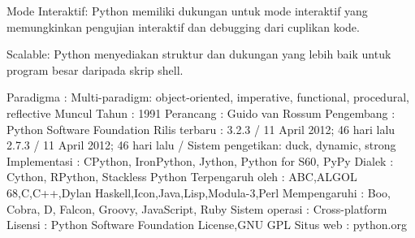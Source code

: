 \noindent 
{\fontsize{14pt}{14pt}\selectfont Mode Interaktif: Python memiliki dukungan untuk mode interaktif yang memungkinkan pengujian interaktif dan debugging dari cuplikan kode. \\} \par
\vspace{14pt}
\vspace{14pt}
\noindent 
{\fontsize{14pt}{14pt}\selectfont Scalable: Python menyediakan struktur dan dukungan yang lebih baik untuk program besar daripada skrip shell. \\} \par
\vspace{14pt}
\noindent 
{\fontsize{14pt}{14pt}\selectfont Paradigma : Multi-paradigm: object-oriented, imperative, functional, procedural, reflective\vspace{\baselineskip}
Muncul Tahun : 1991\vspace{\baselineskip}
Perancang : Guido van Rossum\vspace{\baselineskip}
Pengembang : Python Software Foundation\vspace{\baselineskip}
Rilis terbaru : 3.2.3 / 11 April 2012; 46 hari lalu 2.7.3 / 11 April 2012; 46 hari lalu /\vspace{\baselineskip}
Sistem pengetikan: duck, dynamic, strong\vspace{\baselineskip}
Implementasi : CPython, IronPython, Jython, Python for S60, PyPy\vspace{\baselineskip}
Dialek : Cython, RPython, Stackless Python\vspace{\baselineskip}
Terpengaruh oleh : ABC,ALGOL 68,C,C++,Dylan Haskell,Icon,Java,Lisp,Modula-3,Perl\vspace{\baselineskip}
Mempengaruhi : Boo, Cobra, D, Falcon, Groovy, JavaScript, Ruby\vspace{\baselineskip}
Sistem operasi : Cross-platform\vspace{\baselineskip}
Lisensi : Python Software Foundation License,GNU GPL\vspace{\baselineskip}
Situs web : python.org \\} \par
\noindent 
